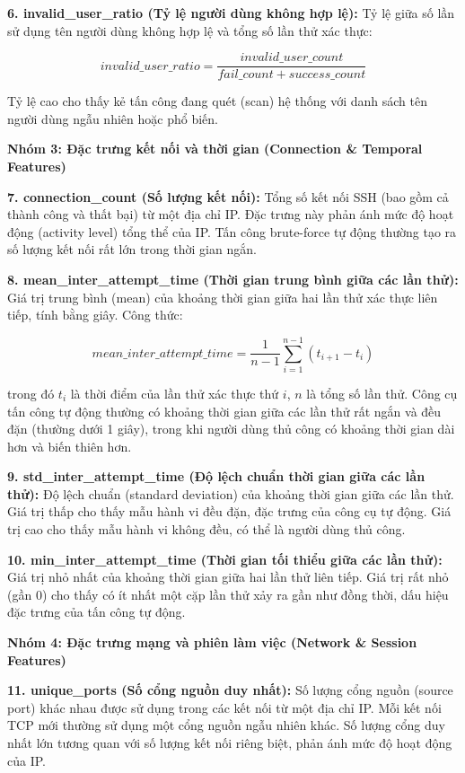 \documentclass[
  a4paper]{report}
\begin{document}
\textbf{6. invalid\_user\_ratio (Tỷ lệ người dùng không hợp lệ):} Tỷ lệ
giữa số lần sử dụng tên người dùng không hợp lệ và tổng số lần thử xác
thực:

\[invalid\_user\_ratio = \frac{invalid\_user\_count}{fail\_count + success\_count}\]

Tỷ lệ cao cho thấy kẻ tấn công đang quét (scan) hệ thống với danh sách
tên người dùng ngẫu nhiên hoặc phổ biến.

\textbf{Nhóm 3: Đặc trưng kết nối và thời gian (Connection \& Temporal
Features)}

\textbf{7. connection\_count (Số lượng kết nối):} Tổng số kết nối SSH
(bao gồm cả thành công và thất bại) từ một địa chỉ IP. Đặc trưng này
phản ánh mức độ hoạt động (activity level) tổng thể của IP. Tấn công
brute-force tự động thường tạo ra số lượng kết nối rất lớn trong thời
gian ngắn.

\textbf{8. mean\_inter\_attempt\_time (Thời gian trung bình giữa các lần
thử):} Giá trị trung bình (mean) của khoảng thời gian giữa hai lần thử
xác thực liên tiếp, tính bằng giây. Công thức:

\[mean\_inter\_attempt\_time = \frac{1}{n-1} \sum_{i=1}^{n-1} (t_{i+1} - t_i)\]

trong đó \(t_i\) là thời điểm của lần thử xác thực thứ \(i\), \(n\) là
tổng số lần thử. Công cụ tấn công tự động thường có khoảng thời gian
giữa các lần thử rất ngắn và đều đặn (thường dưới 1 giây), trong khi
người dùng thủ công có khoảng thời gian dài hơn và biến thiên hơn.

\textbf{9. std\_inter\_attempt\_time (Độ lệch chuẩn thời gian giữa các
lần thử):} Độ lệch chuẩn (standard deviation) của khoảng thời gian giữa
các lần thử. Giá trị thấp cho thấy mẫu hành vi đều đặn, đặc trưng của
công cụ tự động. Giá trị cao cho thấy mẫu hành vi không đều, có thể là
người dùng thủ công.

\textbf{10. min\_inter\_attempt\_time (Thời gian tối thiểu giữa các lần
thử):} Giá trị nhỏ nhất của khoảng thời gian giữa hai lần thử liên tiếp.
Giá trị rất nhỏ (gần 0) cho thấy có ít nhất một cặp lần thử xảy ra gần
như đồng thời, dấu hiệu đặc trưng của tấn công tự động.

\textbf{Nhóm 4: Đặc trưng mạng và phiên làm việc (Network \& Session
Features)}

\textbf{11. unique\_ports (Số cổng nguồn duy nhất):} Số lượng cổng nguồn
(source port) khác nhau được sử dụng trong các kết nối từ một địa chỉ
IP. Mỗi kết nối TCP mới thường sử dụng một cổng nguồn ngẫu nhiên khác.
Số lượng cổng duy nhất lớn tương quan với số lượng kết nối riêng biệt,
phản ánh mức độ hoạt động của IP.
\end{document}
